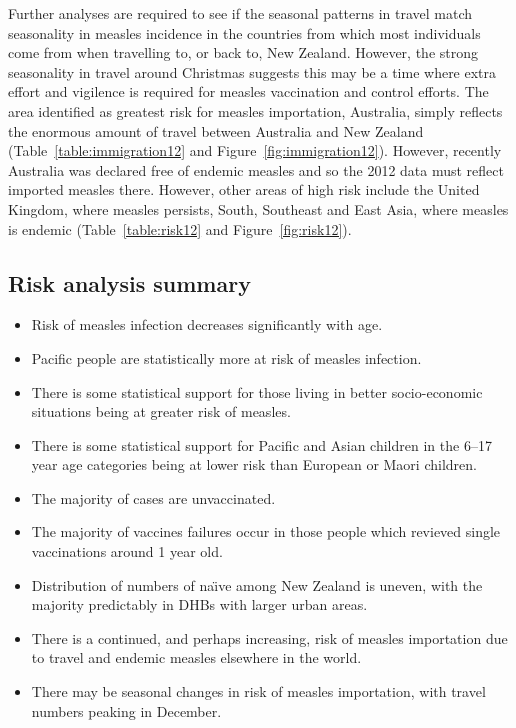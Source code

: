 \documentclass{article}
\begin{document}
\begin{itemize}
Further analyses are required to see if the seasonal patterns in travel match seasonality in measles incidence in the countries from which most individuals come from when travelling to, or back to, New Zealand. However, the strong seasonality in travel around Christmas suggests this may be a time where extra effort and vigilence is required for measles vaccination and control efforts. The area identified as greatest risk for measles importation, Australia, simply reflects the enormous amount of travel between Australia and New Zealand (Table~\ref{table:immigration12} and Figure~\ref{fig:immigration12}). However, recently Australia was declared free of endemic measles and so the 2012 data must reflect imported measles there. However, other areas of high risk include the United Kingdom, where measles persists, South, Southeast and East Asia, where measles is endemic (Table~\ref{table:risk12} and Figure~\ref{fig:risk12}).

\subsection{Risk analysis summary}
\begin{itemize}
\item Risk of measles infection decreases significantly with age.
\item Pacific people are statistically more at risk of measles infection.
\item There is some statistical support for those living in better socio-economic situations being at greater risk of measles.
\item There is some statistical support for Pacific and Asian children in the 6--17 year age categories being at lower risk than European or Maori children.
\item The majority of cases are unvaccinated.
\item The majority of vaccines failures occur in those people which revieved single vaccinations around 1 year old.
\item Distribution of numbers of na\"{\i}ve among New Zealand is uneven, with the majority predictably in DHBs with larger urban areas.
\item There is a continued, and perhaps increasing, risk of measles importation due to travel and endemic measles elsewhere in the world.
\item There may be seasonal changes in risk of measles importation, with travel numbers peaking in December.
\end{itemize}


\end{itemize}
\end{document}
